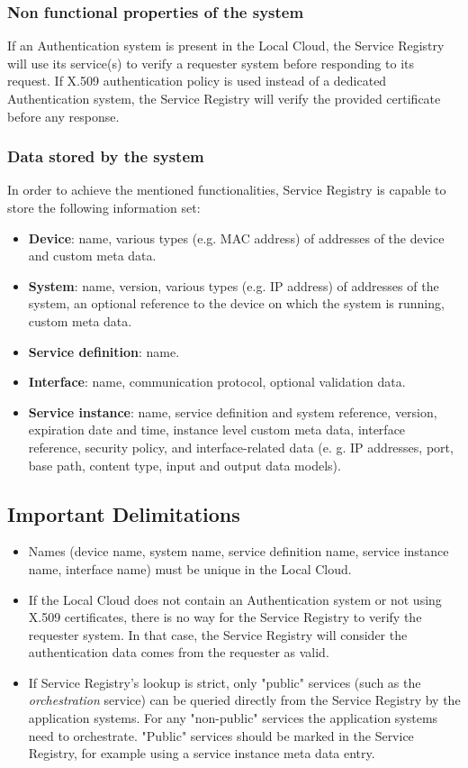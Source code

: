 \documentclass[a4paper]{arrowhead}
\begin{document}
\subsubsection {Non functional properties of the system}
If an Authentication system is present in the Local Cloud, the Service Registry will use its service(s) to verify a requester system before responding to its request. If X.509 authentication policy is used instead of a dedicated Authentication system, the Service Registry will verify the provided certificate before any response.

\subsubsection {Data stored by the system}
In order to achieve the mentioned functionalities, Service Registry is capable to store the following information set:

\begin{itemize}
    \item \textbf{Device}: name, various types (e.g. MAC address) of addresses of the device and custom meta data.
    \item \textbf{System}: name, version, various types (e.g. IP address) of addresses of the system, an optional reference to the device on which the system is running, custom meta data. 
    \item \textbf{Service definition}: name.
    \item \textbf{Interface}: name, communication protocol, optional validation data.
    \item \textbf{Service instance}: name, service definition and system reference, version, expiration date and time, instance level custom meta data, interface reference, security policy, and interface-related data (e. g. IP addresses, port, base path, content type, input and output data models).
\end{itemize}

\subsection{Important Delimitations}
\label{sec:delimitations}

\begin{itemize}
    \item Names (device name, system name, service definition name, service instance name, interface name) must be unique in the Local Cloud.
    \item If the Local Cloud does not contain an Authentication system or not using X.509 certificates, there is no way for the Service Registry to verify the requester system. In that case, the Service Registry will consider the authentication data comes from the requester as valid.
    \item If Service Registry's lookup is strict, only "public" services (such as the \textit{orchestration} service) can be queried directly from the Service Registry by the application systems. For any "non-public" services the application systems need to orchestrate. "Public" services should be marked in the Service Registry, for example using a service instance meta data entry.
\end{itemize}
\end{document}
